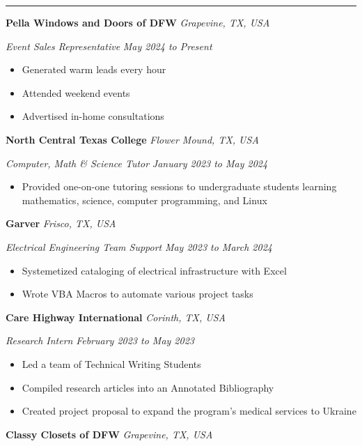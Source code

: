 \documentclass[10pt, a4paper]{article}
\newcommand{\rangesep}{to\xspace}  %
\renewcommand{\date}[1]{\textit{#1}}
\newcommand{\location}[1]{\textit{#1}}
\newcommand{\heading}[1]{
    \makebox[0pt][l]{\Large \sc \hspace{2pt}#1}
    \rule[-0.7ex]{\columnwidth}{0.5pt}\vspace{1.0ex}
}
\newcommand{\subheading}[1]{{\bfseries #1}}
\newcommand{\subheadSkip}{\vspace{0.7ex}}
\newenvironment{mysection}[1]
{\vspace{2.5ex}
\heading{#1}
\begin{adjustwidth}{0.3cm}{0cm}}
{\end{adjustwidth} }
\begin{document}
    \begin{mysection}{Employment}
         \subheading{Pella Windows and Doors of DFW} \hfill \location{Grapevine, TX, USA}

        \vspace{0.1ex}
        \textit{Event Sales Representative} \hfill \date{May 2024 \rangesep Present}
        \begin{itemize}
            \item Generated warm leads every hour
            \item Attended weekend events 
            \item Advertised in-home consultations
        \end{itemize}
        \subheadSkip
         \subheading{North Central Texas College} \hfill \location{Flower Mound, TX, USA}

        \vspace{0.1ex}
        \textit{Computer, Math \& Science Tutor} \hfill \date{January 2023 \rangesep May 2024}
        \begin{itemize}
            \item Provided one-on-one tutoring sessions to undergraduate students learning mathematics, science, computer programming, and Linux
        \end{itemize}
        \subheadSkip
        \subheading{Garver} \hfill \location{Frisco, TX, USA}

        \textit{Electrical Engineering Team Support} \hfill \date{May 2023 \rangesep March 2024}
        \vspace{0.1ex}
        \begin{itemize}
            \item Systemetized cataloging of electrical infrastructure with Excel
            \item Wrote VBA Macros to automate various project tasks
        \end{itemize}
        \subheadSkip
        \subheading{Care Highway International} \hfill \location{Corinth, TX, USA}

        \textit{Research Intern} \hfill \date{February 2023 \rangesep May 2023}
        \vspace{0.1ex}
        \begin{itemize}
            \item Led a team of Technical Writing Students
            \item Compiled research articles into an Annotated Bibliography
            \item Created project proposal to expand the program's medical services to Ukraine
        \end{itemize}
        \subheadSkip
       \subheading{Classy Closets of DFW} \hfill \location{Grapevine, TX, USA}


\end{mysection}
\end{document}

